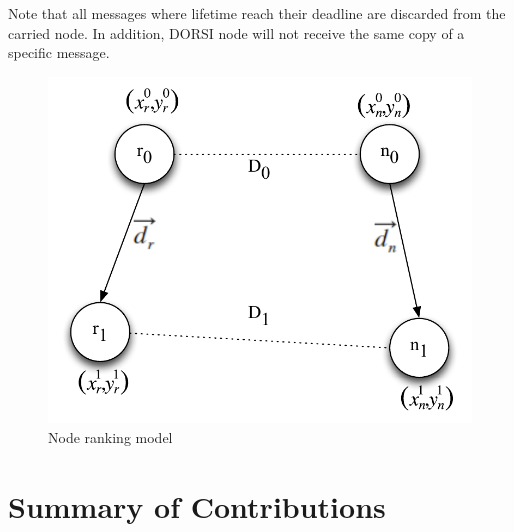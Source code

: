 Note that all messages where lifetime reach their deadline are discarded from the carried node. In addition, DORSI node will not receive the same copy of a specific message.

\begin{figure}[!t]
\centering
\includegraphics[width=5in]{Figures/NodeRankingModel.pdf}
\caption{Node ranking model}
\label{Node ranking model}
\end{figure}

\section{Summary of Contributions}
\label{DORSI:Summary of Contributions}



















































